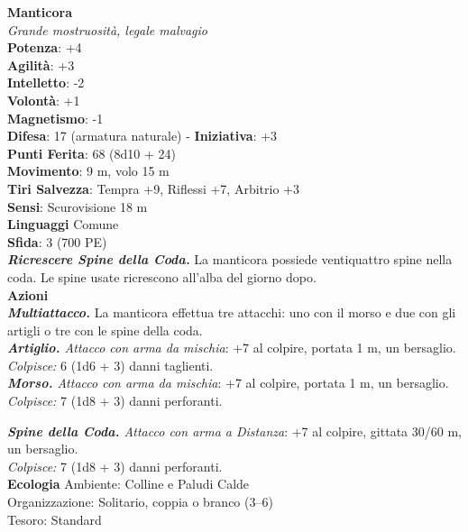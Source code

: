 \begin{multicols}{2}
\medskip\textbf{Manticora}\\
\emph{Grande mostruosità, legale malvagio}\\
\textbf{Potenza}: +4\\
\textbf{Agilità}: +3\\
\textbf{Intelletto}: -2\\
\textbf{Volontà}: +1\\
\textbf{Magnetismo}: -1\\
\textbf{Difesa}: 17 (armatura naturale) - \textbf{Iniziativa}: +3\\
\textbf{Punti Ferita}: 68 (8d10 + 24)\\
\textbf{Movimento}: 9 m, volo 15 m\\
\textbf{Tiri Salvezza}: Tempra +9, Riflessi +7, Arbitrio +3\\
\textbf{Sensi}: Scurovisione 18 m\\
\textbf{Linguaggi} Comune\\
\textbf{Sfida}: 3 (700 PE)\smallskip\\
\emph{\textbf{Ricrescere Spine della Coda.}} La manticora possiede ventiquattro spine nella coda. Le spine usate ricrescono all'alba del giorno dopo.\\

\smallskip\textbf{Azioni}\\

\emph{\textbf{Multiattacco.}} La manticora effettua tre attacchi: uno con il morso e due con gli artigli o tre con le spine della coda.\\

\emph{\textbf{Artiglio.} Attacco con arma da mischia}: +7 al colpire, portata 1 m, un bersaglio.\\

\emph{Colpisce:} 6 (1d6 + 3) danni taglienti.\\

\emph{\textbf{Morso.} Attacco con arma da mischia}: +7 al colpire, portata 1 m, un bersaglio.\\

\emph{Colpisce:} 7 (1d8 + 3) danni perforanti.

\emph{\textbf{Spine della Coda.} Attacco con arma a Distanza}: +7 al colpire, gittata 30/60 m, un bersaglio.\\

\emph{Colpisce:} 7 (1d8 + 3) danni perforanti.\\
\textbf{Ecologia}
Ambiente: Colline e Paludi Calde\\
Organizzazione: Solitario, coppia o branco (3–6)\\
Tesoro: Standard\\


\end{multicols}
